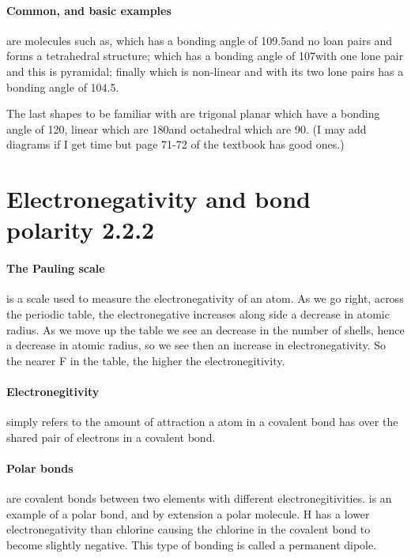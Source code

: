 \documentclass[11pt,a4paper]{memoir}
\begin{document}
	\paragraph{Common, and basic examples} are molecules such as,  which has a bonding angle of 109.5\degree and no loan pairs and forms a tetrahedral structure;  which has a bonding angle of 107\degree with one lone pair and this is pyramidal; finally  which is non-linear and with its two lone pairs has a bonding angle of 104.5\degree .
	
	The last shapes to be familiar with are trigonal planar which have a bonding angle of 120\degree, linear which are 180\degree and octahedral which are 90\degree . (I may add diagrams if I get time but page 71-72 of the textbook has good ones.)
	
\section{Electronegativity and bond polarity 2.2.2}
	\paragraph{The Pauling scale} is a scale used to measure the electronegativity of an atom. As we go right, across the periodic table, the electronegative increases along side a decrease in atomic radius. As we move up the table we see an decrease in the number of shells, hence a decrease in atomic radius, so we see then an increase in electronegativity. So the nearer F in the table, the higher the electronegitivity.
	
	\paragraph{Electronegitivity} simply refers to the amount of attraction a atom in a covalent bond has over the shared pair of electrons in a covalent bond.
	
	\paragraph{Polar bonds} are covalent bonds between two elements with different electronegitivities.  is an example of a polar bond, and by extension a polar molecule. H has a lower electronegativity than chlorine causing the chlorine in the covalent bond to become slightly negative. This type of bonding is called a permanent dipole.
\end{document}
